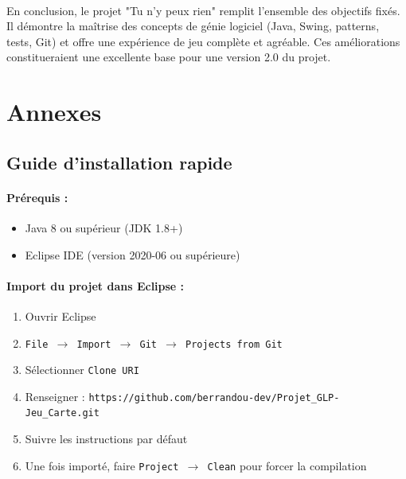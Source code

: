 \paragraph{} En conclusion, le projet "Tu n'y peux rien" remplit l'ensemble des objectifs fixés. Il démontre la maîtrise des concepts de génie logiciel (Java, Swing, patterns, tests, Git) et offre une expérience de jeu complète et agréable. Ces améliorations constitueraient une excellente base pour une version 2.0 du projet.

\newpage
\section{Annexes}
\label{sec:annexes}

\subsection{Guide d'installation rapide}
\paragraph{Prérequis :}
\begin{itemize}
\item Java 8 ou supérieur (JDK 1.8+)
\item Eclipse IDE (version 2020-06 ou supérieure)
\end{itemize}

\paragraph{Import du projet dans Eclipse :}
\begin{enumerate}
\item Ouvrir Eclipse
\item \texttt{File $\rightarrow$ Import $\rightarrow$ Git $\rightarrow$ Projects from Git}
\item Sélectionner \texttt{Clone URI}
\item Renseigner : \texttt{https://github.com/berrandou-dev/Projet\_GLP-Jeu\_Carte.git}
\item Suivre les instructions par défaut
\item Une fois importé, faire \texttt{Project $\rightarrow$ Clean} pour forcer la compilation
\end{enumerate}

